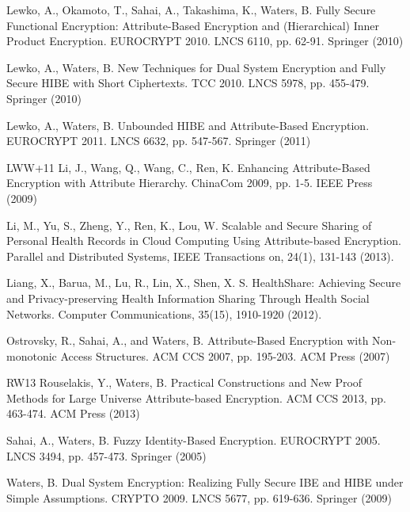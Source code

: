 \documentclass[twocolumn]{svjour3}          \smartqed  \usepackage{graphicx}
\begin{document}
\begin{thebibliography}{11}
 Lewko, A., Okamoto, T., Sahai, A., Takashima, K., Waters, B. Fully Secure Functional Encryption: Attribute-Based Encryption and (Hierarchical)
Inner Product Encryption.  EUROCRYPT 2010. LNCS 6110, pp. 62-91. 
Springer (2010)

 Lewko, A., Waters, B. New Techniques for Dual System Encryption and Fully Secure HIBE with Short Ciphertexts.  TCC 2010.
LNCS 5978, pp. 455-479. Springer (2010)

 Lewko, A., Waters, B. Unbounded HIBE and Attribute-Based Encryption.  EUROCRYPT 2011. LNCS 6632, pp. 547-567.
Springer (2011)







\bibitem
{LWW+11} Li, J., Wang, Q., Wang, C., Ren, K. Enhancing Attribute-Based Encryption with Attribute Hierarchy. ChinaCom 2009, pp. 1-5. IEEE Press (2009)

Li, M., Yu, S., Zheng, Y., Ren, K., Lou, W. Scalable and Secure Sharing of Personal Health Records in Cloud Computing Using Attribute-based Encryption. Parallel and Distributed Systems, IEEE Transactions on, 24(1), 131-143 (2013).

Liang, X., Barua, M., Lu, R., Lin, X., Shen, X. S. HealthShare: Achieving Secure and Privacy-preserving Health Information Sharing Through Health Social Networks. Computer Communications, 35(15), 1910-1920 (2012).







 Ostrovsky, R., Sahai, A., and Waters, B. Attribute-Based Encryption with Non-monotonic Access Structures. ACM CCS 2007, pp. 195-203. ACM Press (2007)



\bibitem
{RW13} Rouselakis, Y., Waters, B. Practical Constructions and New Proof Methods for Large Universe Attribute-based Encryption.  ACM CCS 2013, pp. 463-474. ACM Press (2013)

 Sahai, A., Waters, B. Fuzzy Identity-Based Encryption.  EUROCRYPT 2005. LNCS 3494, pp. 457-473. Springer
(2005)





 Waters, B. Dual System Encryption: Realizing Fully Secure IBE and HIBE under Simple Assumptions. CRYPTO 2009. 
LNCS 5677, pp. 619-636. Springer (2009)


\end{thebibliography}
\end{document}
